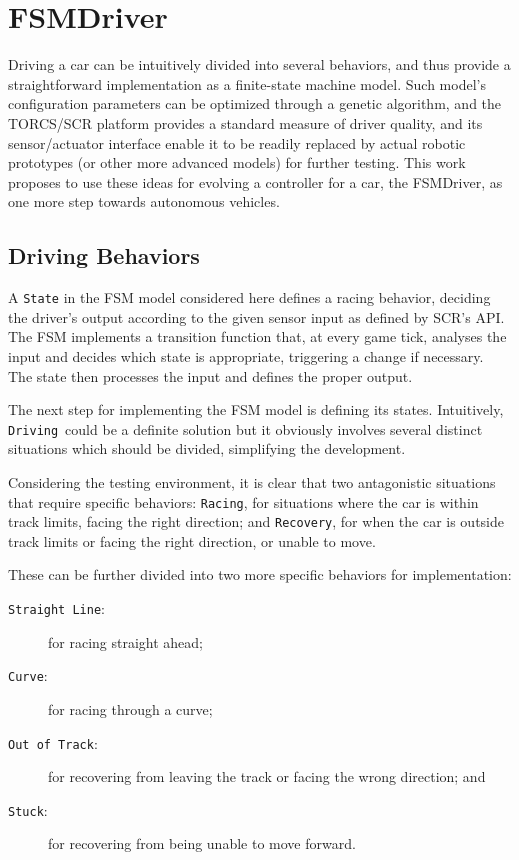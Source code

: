 \section{FSMDriver}\label{sec:3}%
Driving a car can be intuitively divided into several behaviors, and thus provide a straightforward implementation as a finite-state machine model. Such model's configuration parameters can be optimized through a genetic algorithm, and the TORCS/SCR platform provides a standard measure of driver quality, and its sensor/actuator interface enable it to be readily replaced by actual robotic prototypes (or other more advanced models) for further testing. This work proposes to use these ideas for evolving a controller for a car, the FSMDriver, as one more step towards autonomous vehicles.

\newcommand{\state}[1]{\texttt{#1}}%
\newcommand{\SL}{\state{Straight Line}}%
\newcommand{\C}{\state{Curve}}%
\newcommand{\OT}{\state{Out of Track}}%
\newcommand{\St}{\state{Stuck}}%
\newcommand{\AC}{\state{Approaching Curve}}%
\newcommand{\IT}{\state{Inside Track}}%

\subsection{Driving Behaviors}%
A \state{State} in the FSM model considered here defines a racing behavior, deciding the driver's output according to the given sensor input as defined by SCR's API. The FSM implements a transition function that, at every game tick, analyses the input and decides which state is appropriate, triggering a change if necessary. The state then processes the input and defines the proper output.

The next step for implementing the FSM model is defining its states. Intuitively, \state{Driving}~could be a definite solution but it obviously involves several distinct situations which should be divided, simplifying the development.

Considering the testing environment, it is clear that two antagonistic situations that require specific behaviors: \state{Racing}, for situations where the car is within track limits, facing the right direction; and \state{Recovery}, for when the car is outside track limits or facing the right direction, or unable to move.

These can be further divided into two more specific behaviors for implementation:
\begin{description}
	\item[\SL:] for racing straight ahead;
	\item[\C:] for racing through a curve;
	\item[\OT:] for recovering from leaving the track or facing the wrong direction; and
	\item[\St:] for recovering from being unable to move forward.
\end{description}

